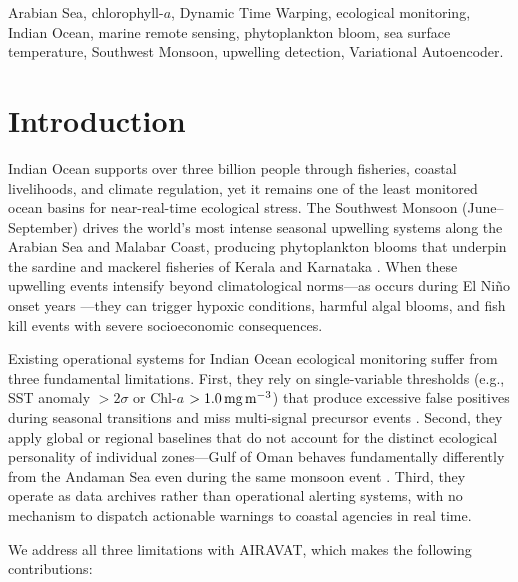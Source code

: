 \documentclass[journal]{IEEEtran}
\begin{document}
\begin{IEEEkeywords}
Arabian Sea, chlorophyll-$a$, Dynamic Time Warping,
ecological monitoring, Indian Ocean, marine remote sensing,
phytoplankton bloom, sea surface temperature, Southwest Monsoon,
upwelling detection, Variational Autoencoder.
\end{IEEEkeywords}

\section{Introduction}
\label{sec:intro}

 Indian Ocean supports over three billion people
through fisheries, coastal livelihoods, and climate regulation, yet
it remains one of the least monitored ocean basins for near-real-time
ecological stress. The Southwest Monsoon (June--September) drives the
world's most intense seasonal upwelling systems along the Arabian Sea
and Malabar Coast, producing phytoplankton blooms that underpin the
sardine and mackerel fisheries of Kerala and Karnataka
\cite{nair1994,bhattathiri1996}. When these upwelling events intensify
beyond climatological norms---as occurs during El Ni\~no onset years
\cite{vinayachandran2002}---they can trigger hypoxic conditions,
harmful algal blooms, and fish kill events with severe socioeconomic
consequences.

Existing operational systems for Indian Ocean ecological monitoring
suffer from three fundamental limitations. First, they rely on
single-variable thresholds (e.g., SST anomaly $> 2\sigma$ or
Chl-$a$ $> 1.0\,\text{mg\,m}^{-3}$) that produce excessive false
positives during seasonal transitions and miss multi-signal precursor
events \cite{martin2014}. Second, they apply global or regional
baselines that do not account for the distinct ecological personality
of individual zones---Gulf of Oman behaves fundamentally differently
from the Andaman Sea even during the same monsoon event
\cite{wiggert2005}. Third, they operate as data archives rather than
operational alerting systems, with no mechanism to dispatch actionable
warnings to coastal agencies in real time.

We address all three limitations with AIRAVAT, which makes the
following contributions:
\end{document}
